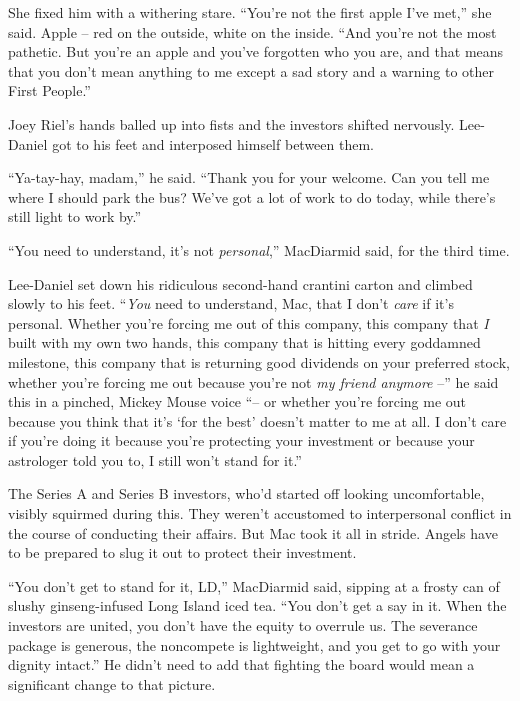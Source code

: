 She fixed him with a withering stare. “You're not the first apple 
I've met,” she said. Apple -- red on the outside, white on the 
inside. “And you're not the most pathetic. But you're an apple and 
you've forgotten who you are, and that means that you don't mean 
anything to me except a sad story and a warning to other First 
People.”

Joey Riel's hands balled up into fists and the investors shifted 
nervously. Lee-Daniel got to his feet and interposed himself between 
them.

“Ya-tay-hay, madam,” he said. “Thank you for your welcome. Can 
you tell me where I should park the bus? We've got a lot of work to do 
today, while there's still light to work by.”

\tb

“You need to understand, it's not \emph{personal},” MacDiarmid 
said, for the third time.

Lee-Daniel set down his ridiculous second-hand crantini carton and 
climbed slowly to his feet. “\emph{You} need to understand, Mac, that 
I don't \emph{care} if it's personal. Whether you're forcing me out of 
this company, this company that \emph{I} built with my own two hands, 
this company that is hitting every goddamned milestone, this company 
that is returning good dividends on your preferred stock, whether 
you're forcing me out because you're not \emph{my friend anymore} --” 
he said this in a pinched, Mickey Mouse voice “-- or whether you're 
forcing me out because you think that it's `for the best' doesn't 
matter to me at all. I don't care if you're doing it because you're 
protecting your investment or because your astrologer told you to, I 
still won't stand for it.”

The Series A and Series B investors, who'd started off looking 
uncomfortable, visibly squirmed during this. They weren't accustomed to 
interpersonal conflict in the course of conducting their affairs. But 
Mac took it all in stride. Angels have to be prepared to slug it out to 
protect their investment.

“You don't get to stand for it, LD,” MacDiarmid said, sipping at a 
frosty can of slushy ginseng-infused Long Island iced tea. “You don't 
get a say in it. When the investors are united, you don't have the 
equity to overrule us. The severance package is generous, the 
noncompete is lightweight, and you get to go with your dignity 
intact.” He didn't need to add that fighting the board would mean a 
significant change to that picture.

